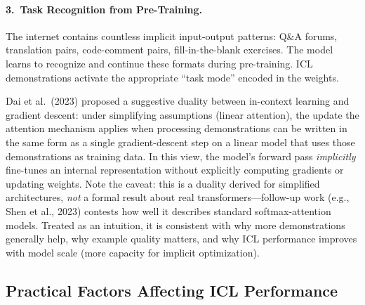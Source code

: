 \paragraph{3.\ Task Recognition from Pre-Training.}
The internet contains countless implicit input-output patterns: Q\&A forums,
translation pairs, code-comment pairs, fill-in-the-blank exercises.  The model
learns to recognize and continue these formats during pre-training.  ICL
demonstrations activate the appropriate ``task mode'' encoded in the weights.

\begin{keyinsight}
Dai et al.\ (2023) proposed a suggestive duality between in-context learning
and gradient descent: under simplifying assumptions (linear attention), the
update the attention mechanism applies when processing demonstrations can be
written in the same form as a single gradient-descent step on a linear model
that uses those demonstrations as training data.  In this view, the model's
forward pass \emph{implicitly} fine-tunes an internal representation without
explicitly computing gradients or updating weights.  Note the caveat: this is
a duality derived for simplified architectures, \emph{not} a formal result
about real transformers---follow-up work (e.g., Shen et al., 2023) contests
how well it describes standard softmax-attention models.  Treated as an
intuition, it is consistent with why more demonstrations generally help, why
example quality matters, and why ICL performance improves with model scale
(more capacity for implicit optimization).
\end{keyinsight}

\subsection{Practical Factors Affecting ICL Performance}

